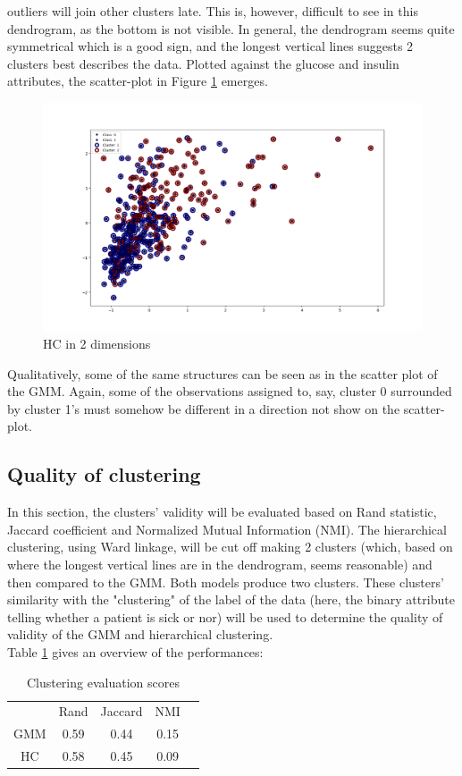 outliers will join other clusters late. This is, however, difficult to see in
this dendrogram, as the bottom is not visible. In general, the dendrogram seems
quite symmetrical which is a good sign, and the longest vertical lines suggests
2 clusters best describes the data. Plotted against the glucose and insulin attributes,
the scatter-plot in Figure \ref{hc} emerges.\\
\begin{figure}[htbp]
  \centering
  \includegraphics[width=\textwidth]{Figure_4.png}
  \caption{HC in 2 dimensions}
  \label{hc}
\end{figure}
Qualitatively, some of the same structures can be seen as in the scatter plot
of the GMM. Again, some of the observations assigned to, say, cluster 0
surrounded by cluster 1's must somehow be different in a direction not show
on the scatter-plot.

\subsection{Quality of clustering}
In this section, the clusters' validity will be evaluated based on Rand statistic,
Jaccard coefficient and Normalized Mutual Information (NMI). The hierarchical clustering,
using Ward linkage, will be cut off making 2 clusters (which, based on where the
longest vertical lines are in the dendrogram, seems reasonable) and then
compared to the GMM. Both models produce two clusters. These clusters' similarity
with the "clustering" of the label of the data (here, the binary attribute telling
whether a patient is sick or nor) will be used to determine the quality of validity
of the GMM and hierarchical clustering.\\
 Table \ref{clusteval} gives an overview of the performances:\\
\begin{table}[h]
\centering
\begin{tabular}{ccccc}
    & Rand & Jaccard & NMI\\
GMM & 0.59 & 0.44 & 0.15 \\
HC & 0.58 & 0.45 & 0.09 \\
\end{tabular}
\caption{Clustering evaluation scores}
\label{clusteval}
\end{table}

